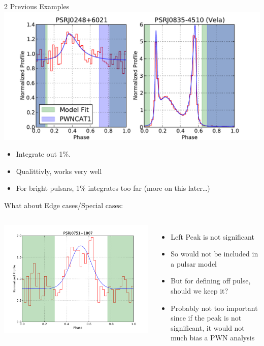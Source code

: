 \documentclass[12pt]{beamer}
\begin{document}
\begin{frame}{2 Previous Examples}
  \includegraphics[width=.85\textwidth]{plots/compare_faint_bright2.pdf}

  \begin{itemize}
    \item Integrate out 1\%. 
    \item Qualittivly, works very well
    \item For bright pulsars, 1\% integrates too far (more on this later\dots)
  \end{itemize}
\end{frame}


\begin{frame}{What about Edge cases/Special cases:}

   \begin{columns}
  \includegraphics[width=1\textwidth]{plots/edge_case.pdf}


  \begin{itemize}
   \item Left Peak is not significant
   \item So would not be included in a pulsar model
   \item But for defining off pulse, should we keep it?
   \item Probably not too important since if the peak is not significant, it would not much bias a PWN analysis
  \end{itemize}
   \end{columns}
\end{frame}
\end{document}

